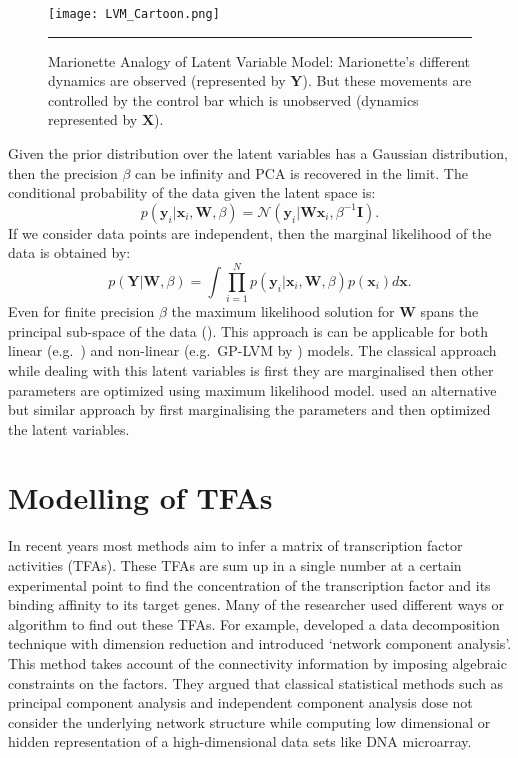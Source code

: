 \begin{figure}
	\centering
		\texttt{[image: LVM\_Cartoon.png]}
		\rule{35em}{0.5pt}
	\caption[Marionette Analogy of Latent Variable Model]
		{Marionette Analogy of Latent Variable Model: Marionette's different dynamics are observed (represented by $\textbf{Y}$). But these movements are controlled by the control bar which is unobserved (dynamics represented by $\textbf{X}$).}
	\label{fig:LVM Cartton}
\end{figure}

Given the prior distribution over the latent variables has a Gaussian distribution, then the precision $\beta$ can be infinity and PCA is recovered in the limit. The conditional probability
of the data given the latent space is:
\begin{equation} \label{eq:cond_prob_latent_space}
p\left(\textbf{y}_i|\textbf{x}_i,\textbf{W},\beta \right) = \mathcal{N} \left(\textbf{y}_i|\textbf{W}\textbf{x}_i,\beta^{-1}\textbf{I}\right).
\end{equation}
If we consider data points are independent, then the marginal likelihood of the data is obtained by:
\begin{equation} \label{eq:marginal_likelihood_latent_space}
p\left(\textbf{Y}|\textbf{W},\beta \right) = 
\int \prod^{N}_{i=1} p\left(\textbf{y}_i|\textbf{x}_i,\textbf{W},\beta\right)p\left(\textbf{x}_i\right)d\textbf{x}.
\end{equation}
Even for finite precision $\beta$ the maximum likelihood solution for $\textbf{W}$ spans the principal sub-space of the data (\cite{Tipping:1999}). This approach is can be applicable for both 
linear (e.g.\ \cite{Silva:2006}) and non-linear (e.g.\ GP-LVM by \cite{Lawrence:2005}) models. The classical approach while dealing with this latent variables is first they are marginalised then
other parameters are optimized using maximum likelihood model. \cite{Lawrence:2005} used an alternative but similar approach by first marginalising the parameters and then optimized the
latent variables.

\section{Modelling of TFAs}
In recent years most methods aim to infer a matrix of transcription factor activities (TFAs). These TFAs are sum up in a single number at a certain experimental point to find the concentration of the transcription factor and its binding affinity to its target genes. Many of the researcher used different ways or algorithm to find out these TFAs. For example, \cite{Liao:2003} developed a data decomposition technique with dimension reduction and introduced ‘network component analysis’. This method takes account of the connectivity information by imposing algebraic constraints on the factors. They argued that classical statistical methods such as principal component analysis and independent component analysis dose not consider the underlying network structure while computing low dimensional or hidden representation of a high-dimensional data sets like DNA microarray. 


